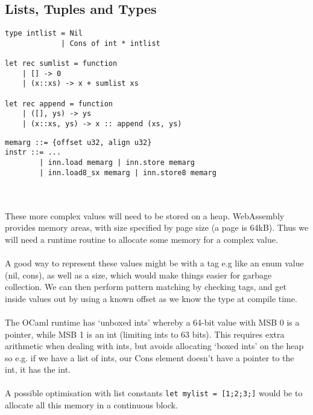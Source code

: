 \documentclass{article}
\newcommand{\camlinline}{\texttt}
\begin{document}
\subsection{Lists, Tuples and Types}
\begin{minipage}{0.5\linewidth}
\begin{verbatim}
type intlist = Nil
             | Cons of int * intlist
             
let rec sumlist = function
    | [] -> 0
    | (x::xs) -> x + sumlist xs
    
let rec append = function
    | ([], ys) -> ys
    | (x::xs, ys) -> x :: append (xs, ys)
\end{verbatim}
\end{minipage}  
\begin{minipage}{0.5\linewidth}
\begin{verbatim}    
memarg ::= {offset u32, align u32}
instr ::= ...
        | inn.load memarg | inn.store memarg
        | inn.load8_sx memarg | inn.store8 memarg
\end{verbatim}
\end{minipage}
\\\\
These more complex values will need to be stored on a heap. WebAssembly provides memory areas, with size specified by page size (a page is 64kB). Thus we will need a runtime routine to allocate some memory for a complex value.
\\\\
A good way to represent these values might be with a tag e.g like an enum value (nil, cons), as well as a size, which would make things easier for garbage collection. We can then perform pattern matching by checking tags, and get inside values out by using a known offset as we know the type at compile time.
\\\\
The OCaml runtime has `unboxed ints' whereby a 64-bit value with MSB 0 is a pointer, while MSB 1 is an int (limiting ints to 63 bits). This requires extra arithmetic when dealing with ints, but avoids allocating `boxed ints' on the heap so e.g. if we have a list of ints, our Cons element doesn't have a pointer to the int, it has the int.
\\\\
A possible optimisation with list constants \camlinline{let mylist = [1;2;3;]} would be to allocate all this memory in a continuous block.
\end{document}
